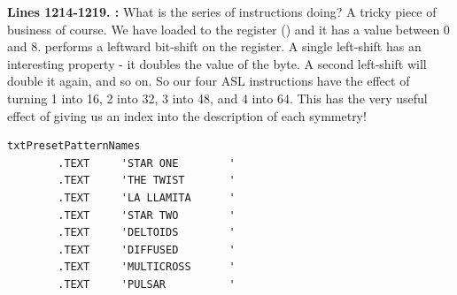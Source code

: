 \textbf{Lines 1214-1219. :} What is the series of  instructions doing? A tricky
piece of business of course. We have loaded  to the  register () and it has a value between 0 and 8.
 performs a leftward bit-shift on the  register. A single left-shift has an interesting property - it doubles the
value of the byte. A second left-shift will double it again, and so on. So our four {ASL} instructions have the effect of turning 1 into
16, 2 into 32, 3 into 48, and 4 into 64. This has the very useful effect of giving us an index into the description of each symmetry!

\begin{lstlisting}
txtPresetPatternNames
        .TEXT     'STAR ONE        '
        .TEXT     'THE TWIST       '
        .TEXT     'LA LLAMITA      '
        .TEXT     'STAR TWO        '
        .TEXT     'DELTOIDS        '
        .TEXT     'DIFFUSED        '
        .TEXT     'MULTICROSS      '
        .TEXT     'PULSAR          '
\end{lstlisting}

